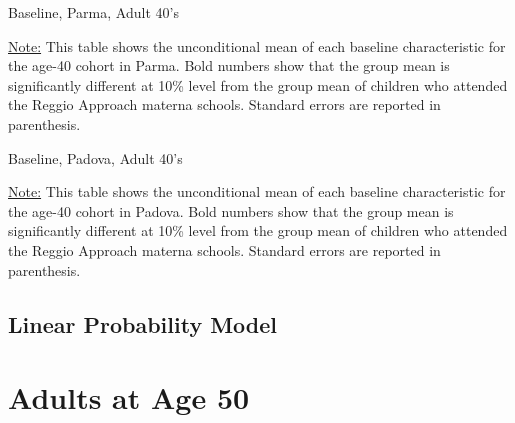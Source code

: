 \documentclass[12pt]{article}
\begin{document}
\begin{table}[H]
\caption{Baseline, Parma, Adult 40's} \label{tab:base-parma-age40}
\begin{center}
\scalebox{0.8}{

}
\end{center}
\begin{footnotesize}
\vspace{0.5mm} 

\underline{Note:} This table shows the unconditional mean of each baseline characteristic for the age-40 cohort in Parma. Bold numbers show that the group mean is significantly different at 10\% level from the group mean of children who attended the Reggio Approach materna schools. Standard errors are reported in parenthesis. 
\end{footnotesize}
\end{table}

\begin{table}[H]
\caption{Baseline, Padova, Adult 40's} \label{tab:base-padova-age40}
\begin{center}
\scalebox{0.8}{

}
\end{center}
\begin{footnotesize}
\vspace{0.5mm} 

\underline{Note:} This table shows the unconditional mean of each baseline characteristic for the age-40 cohort in Padova. Bold numbers show that the group mean is significantly different at 10\% level from the group mean of children who attended the Reggio Approach materna schools. Standard errors are reported in parenthesis. 
\end{footnotesize}
\end{table}

\subsection{Linear Probability Model}






\section{Adults at Age 50}
\end{document}
